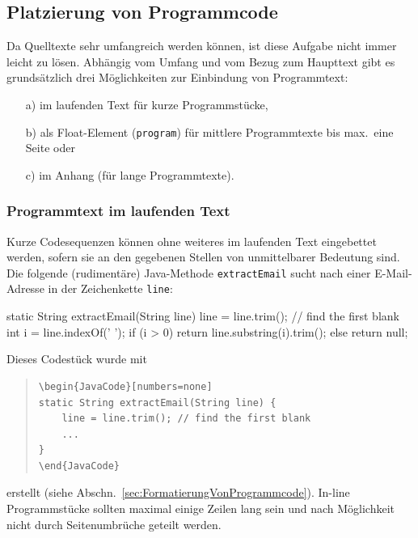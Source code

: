 \subsection{Platzierung von Programmcode}

Da Quelltexte sehr umfangreich werden können, ist diese Aufgabe nicht
immer leicht zu lösen. Abhängig vom Umfang und vom Bezug zum Haupttext
gibt es grundsätzlich drei Möglichkeiten zur Einbindung von Programmtext:
%
\begin{itemize}
\item[a)] im laufenden Text für kurze Programmstücke,
\item[b)] als Float-Element (\texttt{program}) für mittlere Programmtexte bis max.\ eine Seite oder
\item[c)] im Anhang (für lange Programmtexte).
\end{itemize}

\subsubsection{Programmtext im laufenden Text}

Kurze Codesequenzen können ohne weiteres im laufenden Text
eingebettet werden, sofern sie an den gegebenen Stellen von unmittelbarer
Bedeutung sind. Die folgende (rudimentäre) Java-Methode \texttt{extractEmail} sucht
nach einer E-Mail-Adresse in der Zeichenkette
\texttt{line}:
%
\begin{JavaCode}[numbers=none]
static String extractEmail(String line) {
    line = line.trim(); // find the first blank
    int i = line.indexOf(' '); 
    if (i > 0)
        return line.substring(i).trim();
    else
        return null;
}
\end{JavaCode}
\medskip

\noindent
Dieses Codestück wurde mit 
%
\begin{quote}
\begin{verbatim}
\begin{JavaCode}[numbers=none]
static String extractEmail(String line) {
    line = line.trim(); // find the first blank
    ...
}
\end{JavaCode}
\end{verbatim}
\end{quote}
%
erstellt (siehe Abschn.\ \ref{sec:FormatierungVonProgrammcode}). 
In-line Programmstücke sollten maximal einige Zeilen lang sein und 
nach Möglichkeit nicht durch Seitenumbrüche geteilt werden.



